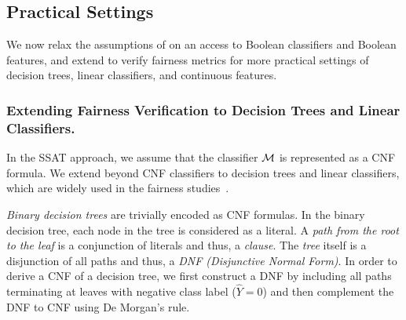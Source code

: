 \subsection{Practical Settings}
\label{sec:practical-setting}
We now relax the assumptions of {\justicia} on an access to Boolean classifiers and Boolean features, and extend {\justicia} to verify fairness metrics for more practical settings of decision trees, linear classifiers, and continuous features.

\subsubsection{Extending Fairness Verification to Decision Trees and Linear Classifiers. }
In the SSAT approach, we assume that the classifier $\mathcal{M}$ is represented as a CNF formula.  
We extend {\justicia} beyond CNF classifiers to decision trees and linear classifiers, which are widely used in the fairness studies~\cite{zemel2013learning,raff2018fair,zhang2019faht}.

\textit{Binary decision trees} are trivially encoded as  CNF formulas.  In the binary decision tree, each node in the tree is considered as a literal. A \textit{path from the root to the leaf} is a conjunction of literals and thus, a \textit{clause}. The \textit{tree} itself is a disjunction of all paths and thus, a \textit{DNF (Disjunctive Normal Form)}. In order to derive a CNF of a decision tree, we first construct a DNF by including all paths terminating at leaves with negative class label ($ \widehat{Y} = 0 $) and then complement the DNF to CNF using De Morgan's rule. 


